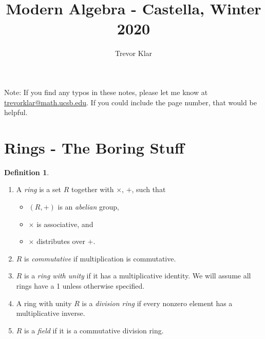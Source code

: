 \documentclass[a5paper]{article}
\title{Modern Algebra - Castella, Winter 2020}
\author{Trevor Klar}
\theoremstyle{definition}%
\newtheorem*{definition*}{Definition}
\numberwithin{exercise}{section}
\theoremstyle{remark}%
\begin{document}
\maketitle

\tableofcontents


\begin{highlight}
Note: If you find any typos in these notes, please let me know at \\ \href{mailto:trevorklar@math.ucsb.edu}{trevorklar@math.ucsb.edu}. If you could include the page number, that would be helpful. 
\end{highlight}

\section*{Rings - The Boring Stuff}


\begin{definition*}\mbox{}
\begin{enumerate}
\item A \emph{ring} is a set $R$ together with $\times$, $+$, such that
	\begin{itemize}
	\item $(R,+)$ is an \emph{abelian} group,
	\item $\times$ is associative, and 
	\item $\times$ distributes over $+$. 
	\end{itemize}
\item $R$ is \emph{commutative} if multiplication is commutative. 
\item $R$ is a \emph{ring with unity} if it has a multiplicative identity. We will assume all rings have a 1	 unless otherwise specified. 
\item A ring with unity $R$ is a \emph{division ring} if every nonzero element has a multiplicative inverse.
\item $R$ is a \emph{field} if it is a commutative division ring. 
\end{enumerate}
\end{definition*}
\end{document}
